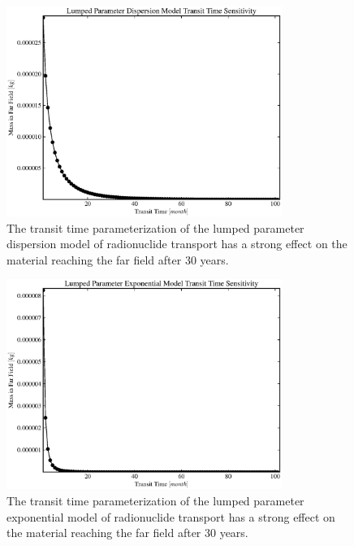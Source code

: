 
\begin{frame}[ctb!]
\begin{figure}[ht]
\centering
\includegraphics[width=0.8\textwidth]{./images/lpDM_t_t.eps}
\caption[Lumped Parameter Dispersion Model Transit Time Sensitivity]{The transit time 
parameterization of the lumped parameter dispersion model of radionuclide 
transport has a strong effect on the material reaching the far field after 30 
years.  }
\label{fig:lp_t_t_begin}
\end{figure}
\end{frame}

\begin{frame}[ctb!]
\begin{figure}[ht]
\centering
\includegraphics[width=0.8\textwidth]{./images/lpEXPM_t_t.eps}
\caption[Lumped Parameter Exponential Model Transit Time Sensitivity]{The transit time 
parameterization of the lumped parameter exponential model of radionuclide 
transport has a strong effect on the material reaching the far field after 30 
years.  }
\end{figure}
\end{frame}

